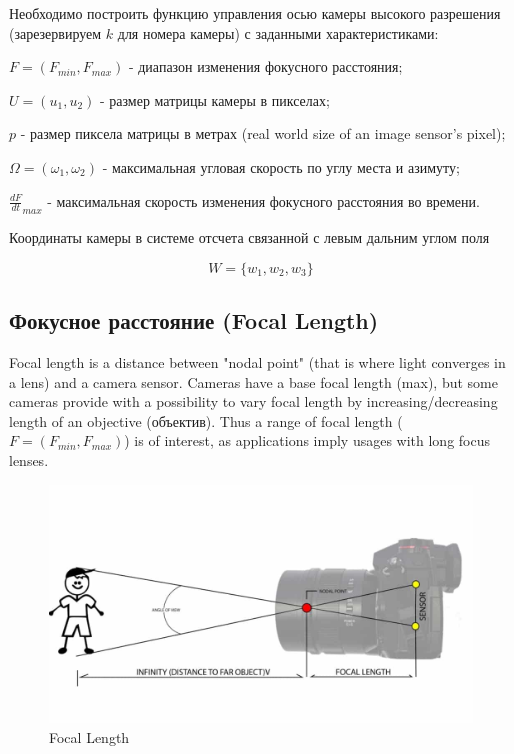 Необходимо построить функцию управления осью камеры высокого разрешения (зарезервируем $k$ для номера камеры) с заданными характеристиками:

$F=(F_{min},F_{max})$ - диапазон изменения фокусного расстояния;

$U=(u_1,u_2)$ - размер матрицы камеры в пикселах;

$p$ - размер пиксела матрицы в метрах (real world size of an image sensor's pixel);

$\Omega=(\omega_1, \omega_2)$ - максимальная угловая скорость по углу места и азимуту;

$\frac{dF}{dt}_{max}$ - максимальная скорость изменения фокусного расстояния во времени.  

Координаты камеры в системе отсчета связанной с левым дальним углом поля 

$$W=\{w_1,w_2,w_3\}$$


\subsection{Фокусное расстояние (Focal Length)}
Focal length is a distance between "nodal point" (that is where light converges in a lens) and a camera sensor\cite{FocalLength}. Cameras have a base focal length (max), but some cameras provide with a possibility to vary focal length by increasing/decreasing length of an objective (объектив). Thus a range of focal length ($F=(F_{min},F_{max})$) is of interest, as applications imply usages with long focus lenses.

 \begin{figure}[!htbp]
     \centering
     \includegraphics[width=0.8\linewidth]{figures/focal.jpg}
     \caption{Focal Length}
     \label{fig:enter-label}
 \end{figure}


